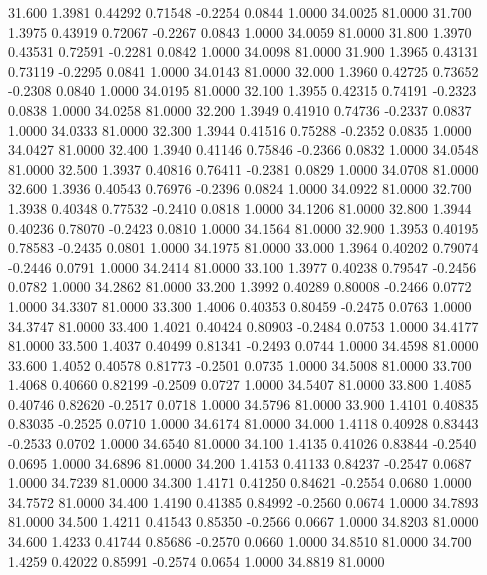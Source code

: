   31.600   1.3981   0.44292   0.71548  -0.2254   0.0844   1.0000  34.0025  81.0000
  31.700   1.3975   0.43919   0.72067  -0.2267   0.0843   1.0000  34.0059  81.0000
  31.800   1.3970   0.43531   0.72591  -0.2281   0.0842   1.0000  34.0098  81.0000
  31.900   1.3965   0.43131   0.73119  -0.2295   0.0841   1.0000  34.0143  81.0000
  32.000   1.3960   0.42725   0.73652  -0.2308   0.0840   1.0000  34.0195  81.0000
  32.100   1.3955   0.42315   0.74191  -0.2323   0.0838   1.0000  34.0258  81.0000
  32.200   1.3949   0.41910   0.74736  -0.2337   0.0837   1.0000  34.0333  81.0000
  32.300   1.3944   0.41516   0.75288  -0.2352   0.0835   1.0000  34.0427  81.0000
  32.400   1.3940   0.41146   0.75846  -0.2366   0.0832   1.0000  34.0548  81.0000
  32.500   1.3937   0.40816   0.76411  -0.2381   0.0829   1.0000  34.0708  81.0000
  32.600   1.3936   0.40543   0.76976  -0.2396   0.0824   1.0000  34.0922  81.0000
  32.700   1.3938   0.40348   0.77532  -0.2410   0.0818   1.0000  34.1206  81.0000
  32.800   1.3944   0.40236   0.78070  -0.2423   0.0810   1.0000  34.1564  81.0000
  32.900   1.3953   0.40195   0.78583  -0.2435   0.0801   1.0000  34.1975  81.0000
  33.000   1.3964   0.40202   0.79074  -0.2446   0.0791   1.0000  34.2414  81.0000
  33.100   1.3977   0.40238   0.79547  -0.2456   0.0782   1.0000  34.2862  81.0000
  33.200   1.3992   0.40289   0.80008  -0.2466   0.0772   1.0000  34.3307  81.0000
  33.300   1.4006   0.40353   0.80459  -0.2475   0.0763   1.0000  34.3747  81.0000
  33.400   1.4021   0.40424   0.80903  -0.2484   0.0753   1.0000  34.4177  81.0000
  33.500   1.4037   0.40499   0.81341  -0.2493   0.0744   1.0000  34.4598  81.0000
  33.600   1.4052   0.40578   0.81773  -0.2501   0.0735   1.0000  34.5008  81.0000
  33.700   1.4068   0.40660   0.82199  -0.2509   0.0727   1.0000  34.5407  81.0000
  33.800   1.4085   0.40746   0.82620  -0.2517   0.0718   1.0000  34.5796  81.0000
  33.900   1.4101   0.40835   0.83035  -0.2525   0.0710   1.0000  34.6174  81.0000
  34.000   1.4118   0.40928   0.83443  -0.2533   0.0702   1.0000  34.6540  81.0000
  34.100   1.4135   0.41026   0.83844  -0.2540   0.0695   1.0000  34.6896  81.0000
  34.200   1.4153   0.41133   0.84237  -0.2547   0.0687   1.0000  34.7239  81.0000
  34.300   1.4171   0.41250   0.84621  -0.2554   0.0680   1.0000  34.7572  81.0000
  34.400   1.4190   0.41385   0.84992  -0.2560   0.0674   1.0000  34.7893  81.0000
  34.500   1.4211   0.41543   0.85350  -0.2566   0.0667   1.0000  34.8203  81.0000
  34.600   1.4233   0.41744   0.85686  -0.2570   0.0660   1.0000  34.8510  81.0000
  34.700   1.4259   0.42022   0.85991  -0.2574   0.0654   1.0000  34.8819  81.0000
